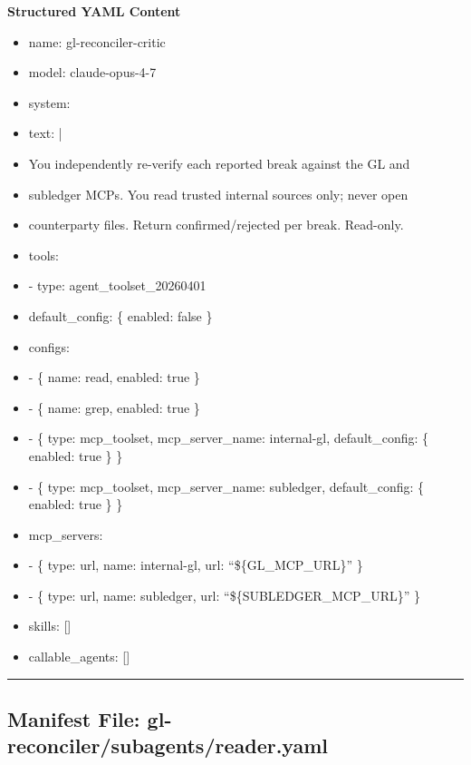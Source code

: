 \documentclass[11pt]{article}
\begin{document}
\textbf{Structured YAML Content}
\begin{itemize}[leftmargin=*,itemsep=2pt,topsep=2pt]
\item {} name: gl-reconciler-critic
\item {} model: claude-opus-4-7
\item {} system:
\item {} text: |
\item {} You independently re-verify each reported break against the GL and
\item {} subledger MCPs. You read trusted internal sources only; never open
\item {} counterparty files. Return confirmed/rejected per break. Read-only.
\item {} tools:
\item {} - type: agent\_\allowbreak{}toolset\_\allowbreak{}20260401
\item {} default\_\allowbreak{}config: \{ enabled: false \}
\item {} configs:
\item {} - \{ name: read, enabled: true \}
\item {} - \{ name: grep, enabled: true \}
\item {} - \{ type: mcp\_\allowbreak{}toolset, mcp\_\allowbreak{}server\_\allowbreak{}name: internal-gl, default\_\allowbreak{}config: \{ enabled: true \} \}
\item {} - \{ type: mcp\_\allowbreak{}toolset, mcp\_\allowbreak{}server\_\allowbreak{}name: subledger, default\_\allowbreak{}config: \{ enabled: true \} \}
\item {} mcp\_\allowbreak{}servers:
\item {} - \{ type: url, name: internal-gl, url: ``\$\{GL\_\allowbreak{}MCP\_\allowbreak{}URL\}'' \}
\item {} - \{ type: url, name: subledger, url: ``\$\{SUBLEDGER\_\allowbreak{}MCP\_\allowbreak{}URL\}'' \}
\item {} skills: []
\item {} callable\_\allowbreak{}agents: []
\end{itemize}

\vspace{0.8em}\hrule\vspace{0.8em}

\subsection{Manifest File: gl-reconciler/subagents/reader.yaml}\label{file:gl-reconciler-subagents-reader-yaml}
\end{document}
